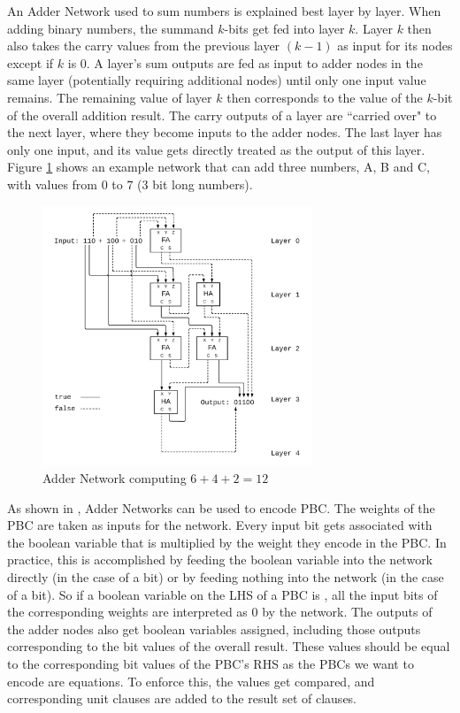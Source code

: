 An Adder Network used to sum numbers is explained best layer by layer. When adding binary numbers, the summand $k$-bits get fed into layer $k$. Layer $k$ then also takes the carry values from the previous layer $(k-1)$ as input for its nodes except if $k$ is $0$.  A layer's sum outputs are fed as input to adder nodes in the same layer (potentially requiring additional nodes) until only one input value remains. The remaining value of layer $k$ then corresponds to the value of the $k$-bit of the overall addition result. The carry outputs of a layer are ``carried over" to the next layer, where they become inputs to the adder nodes. The last layer has only one input, and its value gets directly treated as the output of this layer. Figure \ref{fig:AdderNetworkExample} shows an example network that can add three numbers, A, B and C, with values from $0$ to $7$ ($3$ bit long numbers).\\

\begin{figure}[ht!]
\centering
\includegraphics[width=0.72\textwidth]{Figures/AdderNetworkExample2.png}
\caption{Adder Network computing $6 + 4 + 2 = 12$}
\label{fig:AdderNetworkExample}
\end{figure}

As shown in \cite{Een2006TranslatingPC}, Adder Networks can be used to encode PBC. The weights of the PBC are taken as inputs for the network. Every input bit gets associated with the boolean variable that is multiplied by the weight they encode in the PBC. In practice, this is accomplished by feeding the boolean variable into the network directly (in the case of a \true{} bit) or by feeding nothing into the network (in the case of a \false{} bit). So if a boolean variable on the LHS of a PBC is \false{}, all the input bits of the corresponding weights are interpreted as $0$ by the network. The outputs of the adder nodes also get boolean variables assigned, including those outputs corresponding to the bit values of the overall result. These values should be equal to the corresponding bit values of the PBC's RHS as the PBCs we want to encode are equations. To enforce this, the values get compared, and corresponding unit clauses are added to the result set of clauses.\\

